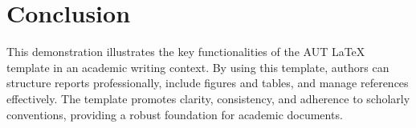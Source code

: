 \documentclass{aut_document}
\begin{document}
\section{Conclusion}

This demonstration illustrates the key functionalities of the AUT LaTeX template 
in an academic writing context. By using this template, authors can structure 
reports professionally, include figures and tables, and manage references 
effectively. The template promotes clarity, consistency, and adherence to scholarly 
conventions, providing a robust foundation for academic documents.

\printbibliography

\makebackcover
\end{document}
